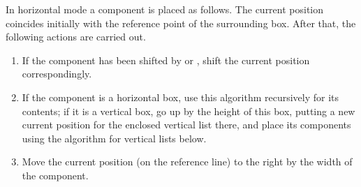 \documentclass{book}
\begin{document}
In horizontal mode a component is placed as follows.
The current position coincides initially
with the reference point of the surrounding box. After that,
the following actions are carried out.
\begin{enumerate} \item If the component has been shifted by
 or , shift the current
position correspondingly.
\item If the component is a horizontal box, use
this algorithm recursively for its contents;
if it is a vertical box, go up  by the height of this box,
putting  a new current position for the enclosed vertical list there,
and place its components using the algorithm for vertical
lists below.
\item Move the current position (on the reference line)
to the right by the width of the component.
\end{enumerate}
\end{document}
